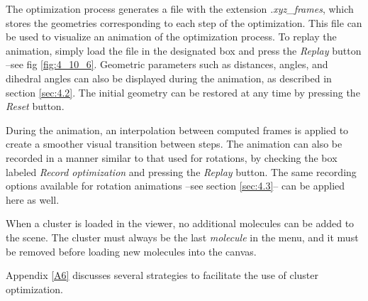 \documentclass[10pt]{article}
\begin{document}
The optimization process generates a file with the extension  
{\it .xyz\_frames}, which stores the geometries corresponding to each step of the  
optimization. This file can be used to visualize an animation of the optimization  
process. To replay the animation, simply load the file in the designated  
box and press the {\it Replay} button --see fig \ref{fig:4_10_6}.  
Geometric parameters such as distances, angles, and dihedral angles  
can also be displayed during the animation, as described in section \ref{sec:4.2}.  
The initial geometry can be restored at any time by pressing the {\it Reset} button.

During the animation, an interpolation between computed frames is applied to create a  
smoother visual transition between steps.  
The animation can also be recorded  
in a manner similar to that used for rotations,  
by checking the box labeled {\it Record optimization} and pressing the {\it Replay} button.  
The same recording options available for rotation animations --see section \ref{sec:4.3}--  
can be applied here as well.

When a cluster is loaded in the viewer, no additional molecules can be added to the scene.  
The cluster must always be the last {\it molecule} in the menu, and it must be removed  
before loading new molecules into the canvas.

Appendix \ref{A6} discusses several strategies to facilitate the use of cluster optimization.
\end{document}

